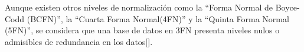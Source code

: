 Aunque existen otros niveles de normalización como la ``Forma Normal de Boyce-Codd (BCFN)'',
la ``Cuarta Forma Normal(4FN)'' y la ``Quinta Forma Normal (5FN)'',
se considera que una base de datos en 3FN presenta niveles nulos o 
admisibles de redundancia en los datos[\cite{ws_3FN}].





